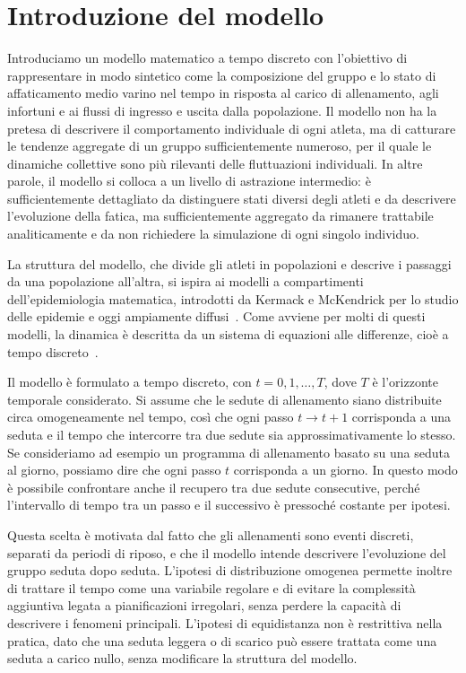\chapter{Introduzione del modello}

Introduciamo un modello matematico a tempo discreto con l'obiettivo di rappresentare in modo sintetico come la composizione del gruppo e lo stato di affaticamento medio varino nel tempo in risposta al carico di allenamento, agli infortuni e ai flussi di ingresso e uscita dalla popolazione. Il modello non ha la pretesa di descrivere il comportamento individuale di ogni atleta, ma di catturare le tendenze aggregate di un gruppo sufficientemente numeroso, per il quale le dinamiche collettive sono più rilevanti delle fluttuazioni individuali. In altre parole, il modello si colloca a un livello di astrazione intermedio: è sufficientemente dettagliato da distinguere stati diversi degli atleti e da descrivere l'evoluzione della fatica, ma sufficientemente aggregato da rimanere trattabile analiticamente e da non richiedere la simulazione di ogni singolo individuo. \par

La struttura del modello, che divide gli atleti in popolazioni e descrive i passaggi da una popolazione all'altra, si ispira ai modelli a compartimenti dell'epidemiologia matematica, introdotti da Kermack e McKendrick per lo studio delle epidemie e oggi ampiamente diffusi~\cite{kermack1927}. Come avviene per molti di questi modelli, la dinamica è descritta da un sistema di equazioni alle differenze, cioè a tempo discreto~\cite{brauer2010}. \par

Il modello è formulato a tempo discreto, con $t = 0, 1, \dots, T$, dove $T$ è l'orizzonte temporale considerato. Si assume che le sedute di allenamento siano distribuite circa omogeneamente nel tempo, così che ogni passo $t \to t+1$ corrisponda a una seduta e il tempo che intercorre tra due sedute sia approssimativamente lo stesso. \\
Se consideriamo ad esempio un programma di allenamento basato su una seduta al giorno, possiamo dire che ogni passo $t$ corrisponda a un giorno. In questo modo è possibile confrontare anche il recupero tra due sedute consecutive, perché l'intervallo di tempo tra un passo e il successivo è pressoché costante per ipotesi. \par

Questa scelta è motivata dal fatto che gli allenamenti sono eventi discreti, separati da periodi di riposo, e che il modello intende descrivere l'evoluzione del gruppo seduta dopo seduta. L'ipotesi di distribuzione omogenea permette inoltre di trattare il tempo come una variabile regolare e di evitare la complessità aggiuntiva legata a pianificazioni irregolari, senza perdere la capacità di descrivere i fenomeni principali. L'ipotesi di equidistanza non è restrittiva nella pratica, dato che una seduta leggera o di scarico può essere trattata come una seduta a carico nullo, senza modificare la struttura del modello.

